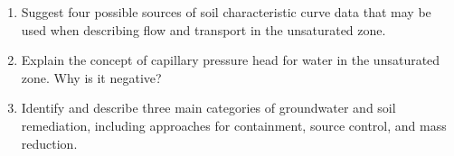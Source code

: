 \documentclass[12pt]{article}
\begin{document}
\begin{enumerate}
\item Suggest four possible sources of soil characteristic curve data that may be used when describing flow and transport in the unsaturated zone.
\item Explain the concept of capillary pressure head for water in the unsaturated zone. Why is it negative?





\item Identify and describe three main categories of groundwater and soil remediation, including approaches for containment, source control, and mass reduction.


\end{enumerate}
\end{document}
